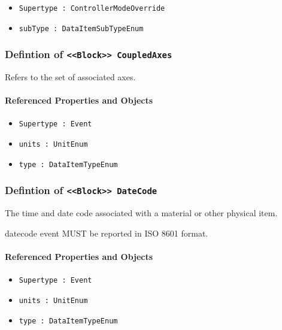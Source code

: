 \begin{itemize}
\item \texttt{Supertype : ControllerModeOverride}

\item \texttt{subType : DataItemSubTypeEnum}

\end{itemize}
\FloatBarrier
\subsubsection{Defintion of \texttt{<<Block>> CoupledAxes}}
  \label{type:CoupledAxes}

\FloatBarrier

Refers to the set of associated axes.

\FloatBarrier
\paragraph{Referenced Properties and Objects}

\begin{itemize}
\item \texttt{Supertype : Event}

\item \texttt{units : UnitEnum}

\item \texttt{type : DataItemTypeEnum}

\end{itemize}
\FloatBarrier
\subsubsection{Defintion of \texttt{<<Block>> DateCode}}
  \label{type:DateCode}

\FloatBarrier

The time and date code associated with a material or other physical item.
  
 datecode event MUST be reported in ISO 8601 format.

\FloatBarrier
\paragraph{Referenced Properties and Objects}

\begin{itemize}
\item \texttt{Supertype : Event}

\item \texttt{units : UnitEnum}

\item \texttt{type : DataItemTypeEnum}

\end{itemize}
\FloatBarrier
